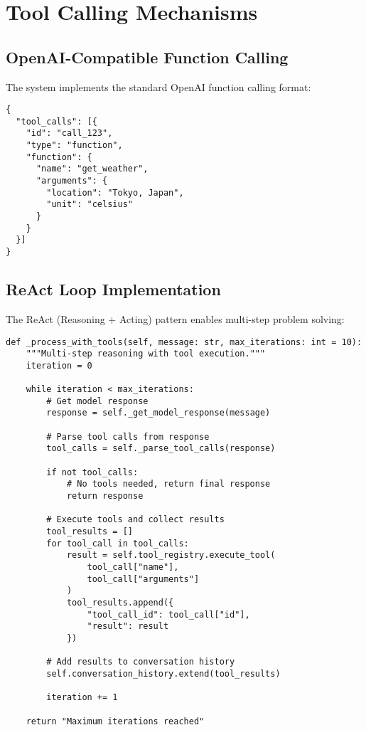 \documentclass{article}
\begin{document}
\section{Tool Calling Mechanisms}

\subsection{OpenAI-Compatible Function Calling}

The system implements the standard OpenAI function calling format:

\begin{lstlisting}[caption=Function Calling Schema]
{
  "tool_calls": [{
    "id": "call_123",
    "type": "function",
    "function": {
      "name": "get_weather",
      "arguments": {
        "location": "Tokyo, Japan",
        "unit": "celsius"
      }
    }
  }]
}
\end{lstlisting}

\subsection{ReAct Loop Implementation}

The ReAct (Reasoning + Acting) pattern enables multi-step problem solving:

\begin{lstlisting}[caption=ReAct Loop Implementation]
def _process_with_tools(self, message: str, max_iterations: int = 10):
    """Multi-step reasoning with tool execution."""
    iteration = 0

    while iteration < max_iterations:
        # Get model response
        response = self._get_model_response(message)

        # Parse tool calls from response
        tool_calls = self._parse_tool_calls(response)

        if not tool_calls:
            # No tools needed, return final response
            return response

        # Execute tools and collect results
        tool_results = []
        for tool_call in tool_calls:
            result = self.tool_registry.execute_tool(
                tool_call["name"],
                tool_call["arguments"]
            )
            tool_results.append({
                "tool_call_id": tool_call["id"],
                "result": result
            })

        # Add results to conversation history
        self.conversation_history.extend(tool_results)

        iteration += 1

    return "Maximum iterations reached"
\end{lstlisting}
\end{document}
